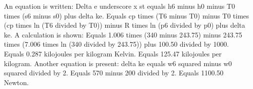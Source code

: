 An equation is written: 
Delta e underscore x st equals h6 minus h0 minus T0 times (s6 minus s0) plus delta ke. 
Equals cp times (T6 minus T0) minus T0 times (cp times ln (T6 divided by T0)) minus R times ln (p6 divided by p0) plus delta ke. 
A calculation is shown: 
Equals 1.006 times (340 minus 243.75) minus 243.75 times (7.006 times ln (340 divided by 243.75)) plus 100.50 divided by 1000. 
Equals 0.287 kilojoules per kilogram Kelvin. 
Equals 125.47 kilojoules per kilogram. 
Another equation is present: 
delta ke equals w6 squared minus w0 squared divided by 2. 
Equals 570 minus 200 divided by 2. 
Equals 1100.50 Newton.